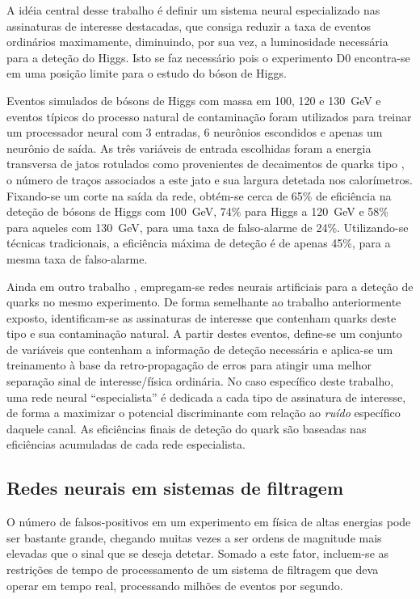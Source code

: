 A idéia central desse trabalho é definir um sistema neural especializado nas
assinaturas de interesse destacadas, que consiga reduzir a taxa de eventos
ordinários maximamente, diminuindo, por sua vez, a luminosidade necessária
para a deteção do Higgs. Isto se faz necessário pois o experimento D0
encontra-se em uma posição limite para o estudo do bóson de Higgs.

Eventos simulados de bósons de Higgs com massa em 100, 120 e 130~GeV e eventos
típicos do processo natural de contaminação foram utilizados para treinar um
processador neural com 3 entradas, 6 neurônios escondidos e apenas um neurônio
de saída. As três variáveis de entrada escolhidas foram a energia transversa
de jatos rotulados como provenientes de decaimentos de quarks tipo
, o número de traços associados a este jato e sua largura detetada
nos calorímetros. Fixando-se um corte na saída da rede, obtém-se cerca de 65\%
de eficiência na deteção de bósons de Higgs com 100~GeV, 74\% para Higgs a
120~GeV e 58\% para aqueles com 130~GeV, para uma taxa de falso-alarme de
24\%. Utilizando-se técnicas tradicionais, a eficiência máxima de deteção é de
apenas 45\%, para a mesma taxa de falso-alarme.

Ainda em outro trabalho \cite{dudko-acat-2001}, empregam-se redes neurais
artificiais para a deteção de  quarks no mesmo experimento. De forma
semelhante ao trabalho anteriormente exposto, identificam-se as assinaturas
de interesse que contenham quarks deste tipo e sua contaminação natural. A
partir destes eventos, define-se um conjunto de variáveis que contenham a
informação de deteção necessária e aplica-se um treinamento à base da
retro-propagação de erros para atingir uma melhor separação sinal de
interesse/física ordinária. No caso específico deste trabalho, uma rede neural
``especialista'' é dedicada a cada tipo de assinatura de interesse, de forma a
maximizar o potencial discriminante com relação ao \textit{ruído} específico
daquele canal. As eficiências finais de deteção do  quark são
baseadas nas eficiências acumuladas de cada rede especialista.

\subsection{Redes neurais em sistemas de filtragem}

O número de falsos-positivos em um experimento em física de altas energias pode
ser bastante grande, chegando muitas vezes a ser ordens de magnitude mais
elevadas que o sinal que se deseja detetar. Somado a este fator, incluem-se as
restrições de tempo de processamento de um sistema de filtragem que deva
operar em tempo real, processando milhões de eventos por segundo.

